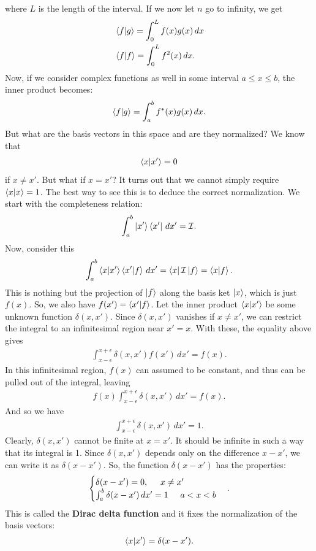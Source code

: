 \documentclass{book}
\theoremstyle{definition}
\newcommand{\Id}{\mathcal{I}}
\begin{document}
where $L$ is the length of the interval. If we now let $n$ go to infinity, we get
\begin{align}
&\braket{f}{g} = \int^L_0 f(x)g(x)\,dx\\
&\braket{f} = \int^L_0 f^2(x)\,dx.
\end{align}
Now, if we consider complex functions as well in some interval $a\leq x \leq b$, the inner product becomes:
\begin{align}
\braket{f}{g} = \int^b_a f^*(x)g(x)\,dx.
\end{align}
But what are the basis vectors in this space and are they normalized? We know that 
\begin{align}
\braket{x}{x'} = 0
\end{align}
if $x \neq x'$. But what if $x = x'$? It turns out that we cannot simply require $\braket{x}{x} = 1$. The best way to see this is to deduce the correct normalization. We start with the completeness relation:
\begin{align}
\int^b_a \ket{x'}\bra{x'}\,dx' = \Id. 
\end{align}
Now, consider this
\begin{align}
\int^b_a \braket{x}{x'}\braket{x'}{f}\,dx' = \bra{x}\Id \ket{f} = \braket{x}{f}.
\end{align}
This is nothing but the projection of $\ket{f}$ along the basis ket $\ket{x}$, which is just $f(x)$. So, we also have $f(x') = \braket{x'}{f}$. Let the inner product $\braket{x}{x'}$ be some unknown function $\delta(x,x')$. Since $\delta(x,x')$ vanishes if $x\neq x'$, we can restrict the integral to an infinitesimal region near $x'=x$. With these, the equality above gives
\begin{align}\label{delt}
\int^{x+\epsilon}_{x-\epsilon}\delta(x,x')f(x')\,dx' = f(x).
\end{align}
In this infinitesimal region, $f(x)$ can assumed to be constant, and thus can be pulled out of the integral, leaving
\begin{align}
f(x)\int^{x+\epsilon}_{x-\epsilon} \delta(x,x')\,dx' = f(x).
\end{align}
And so we have
\begin{align}
\int^{x+\epsilon}_{x-\epsilon} \delta(x,x')\,dx' = 1. 
\end{align}
Clearly, $\delta(x,x')$ cannot be finite at $x=x'$. It should be infinite in such a way that its integral is 1. Since $\delta(x,x')$ depends only on the difference $x-x'$, we can write it as $\delta(x-x')$. So, the function $\delta(x-x')$ has the properties:
\begin{align}
\begin{cases}
\delta(x-x') = 0, \hspace{0.5cm} x \neq x'\\
\int^b_a \delta(x-x')\,dx' = 1\hspace{0.5cm} a < x < b
\end{cases}.
\end{align}
This is called the \textbf{Dirac delta function} and it fixes the normalization of the basis vectors:
\begin{align}
\braket{x}{x'} = \delta(x-x').
\end{align}
\end{document}
